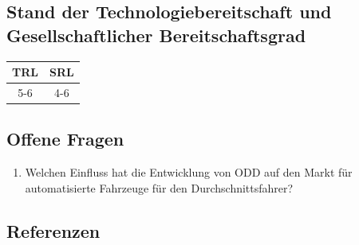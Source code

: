 \documentclass[
]{book}
\providecommand{\tightlist}{%
  \setlength{\itemsep}{0pt}\setlength{\parskip}{0pt}}
\begin{document}
\hypertarget{stand-der-technologiebereitschaft-und-gesellschaftlicher-bereitschaftsgrad}{%
\subsection*{Stand der Technologiebereitschaft und Gesellschaftlicher Bereitschaftsgrad}\label{stand-der-technologiebereitschaft-und-gesellschaftlicher-bereitschaftsgrad}}

\begin{longtable}[]{@{}cc@{}}
\toprule
TRL & SRL\tabularnewline
\midrule
\endhead
5-6 & 4-6\tabularnewline
\bottomrule
\end{longtable}

\hypertarget{offene-fragen-1}{%
\subsection*{Offene Fragen}\label{offene-fragen-1}}

\begin{enumerate}
\def\labelenumi{\arabic{enumi}.}
\tightlist
\item
  Welchen Einfluss hat die Entwicklung von ODD auf den Markt für automatisierte Fahrzeuge für den Durchschnittsfahrer?
\end{enumerate}

\hypertarget{referenzen-1}{%
\subsection*{Referenzen}\label{referenzen-1}}
\end{document}
